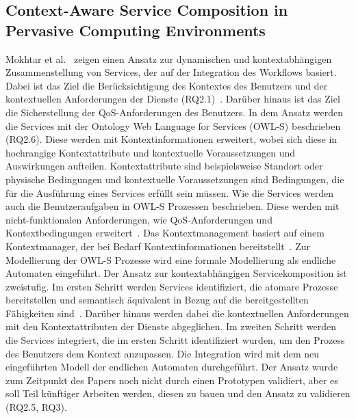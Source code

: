 \documentclass[conference,compsoc,ngerman]{IEEEtran}
\begin{document}
\subsection{Context-Aware Service Composition in Pervasive Computing Environments}
Mokhtar et al.~\cite{mokhtar2005context} zeigen einen Ansatz zur dynamischen und kontextabhängigen Zusammenstellung von Services, der auf der Integration des Workflows basiert. Dabei ist das Ziel die Berücksichtigung des Kontextes des Benutzers und der kontextuellen Anforderungen der Dienste (RQ2.1)~\cite{mokhtar2005context}. Darüber hinaus ist das Ziel die Sicherstellung der QoS-Anforderungen des Benutzers. In dem Ansatz werden die Services mit der Ontology Web Language for Services (OWL-S) beschrieben (RQ2.6). Diese werden mit Kontextinformationen erweitert, wobei sich diese in hochrangige Kontextattribute und kontextuelle Voraussetzungen und Auswirkungen aufteilen. Kontextattribute sind beispielsweise Standort oder physische Bedingungen und kontextuelle Voraussetzungen sind Bedingungen, die für die Ausführung eines Services erfüllt sein müssen. Wie die Services werden auch die Benutzeraufgaben in OWL-S Prozessen beschrieben. Diese werden mit nicht-funktionalen Anforderungen, wie QoS-Anforderungen und Kontextbedingungen erweitert~\cite{mokhtar2005context}. Das Kontextmanagement basiert auf einem Kontextmanager, der bei Bedarf Kontextinformationen bereitstellt~\cite{mokhtar2005context}.
Zur Modellierung der OWL-S Prozesse wird eine formale Modellierung als endliche Automaten eingeführt.
Der Ansatz zur kontextabhängigen Servicekomposition ist zweistufig. Im ersten Schritt werden Services identifiziert, die atomare Prozesse bereitstellen und semantisch äquivalent in Bezug auf die bereitgestellten Fähigkeiten sind~\cite{mokhtar2005context}. Darüber hinaus werden dabei die kontextuellen Anforderungen mit den Kontextattributen der Dienste abgeglichen.
Im zweiten Schritt werden die Services integriert, die im ersten Schritt identifiziert wurden, um den Prozess des Benutzers dem Kontext anzupassen. Die Integration wird mit dem neu eingeführten Modell der endlichen Automaten durchgeführt.
Der Ansatz wurde zum Zeitpunkt des Papers noch nicht durch einen Prototypen validiert, aber es soll Teil künftiger Arbeiten werden, diesen zu bauen und den Ansatz zu validieren (RQ2.5, RQ3).
\end{document}
